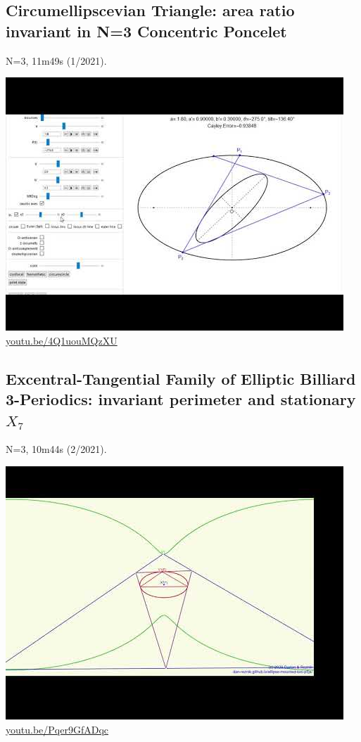 \documentclass[12pt]{amsart}
\begin{document}
\subsection{Circumellipscevian Triangle: area ratio invariant in N=3 Concentric Poncelet}
\label{vid:4Q1uouMQzXU}
\noindent N=3, 11m49s (1/2021). 
\begin{center}\includegraphics[width=.5\textwidth]{pics/4Q1uouMQzXU.jpg} \\ 
\href{https://youtu.be/4Q1uouMQzXU}{\url{youtu.be/4Q1uouMQzXU}}\end{center}
% 
\subsection{Excentral-Tangential Family of Elliptic Billiard 3-Periodics: invariant perimeter and stationary $X_{7}$}
\label{vid:Pqer9GfADqc}
\noindent N=3, 10m44s (2/2021). 
\begin{center}\includegraphics[width=.5\textwidth]{pics/Pqer9GfADqc.jpg} \\ 
\href{https://youtu.be/Pqer9GfADqc}{\url{youtu.be/Pqer9GfADqc}}\end{center}
% 
\end{document}
